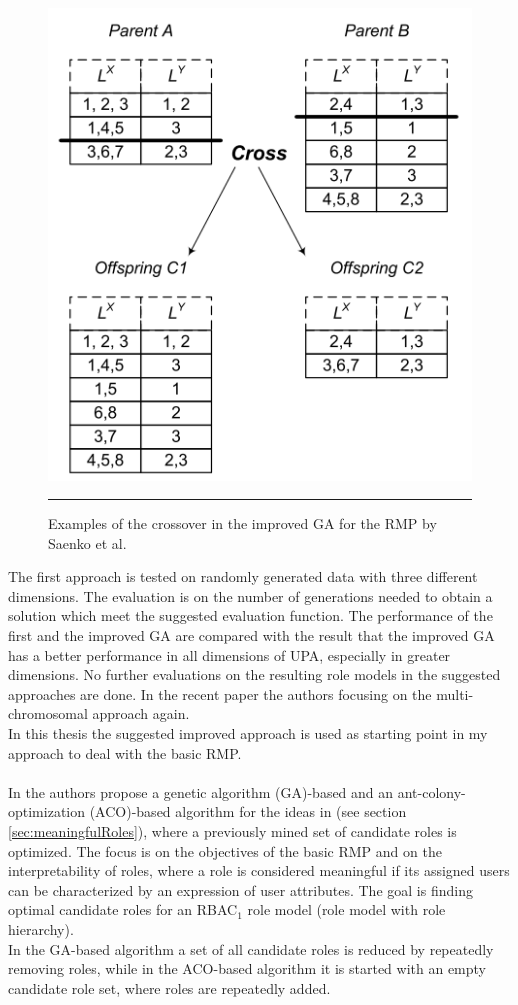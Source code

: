 \begin{figure}[H]
    \centering
    \includegraphics[scale=0.8]{./Figures/crossover.png}
    \rule{20em}{0.5pt}
    \caption{Examples of the crossover in the improved GA for the RMP by Saenko et al.\cite{saenko2012design}}
    \label{fig:crossover}
\end{figure}
The first approach is tested on randomly generated data with three different dimensions\cite{Igor}. The evaluation is on the number of generations needed to obtain a solution which meet the suggested evaluation function. The performance of the first and the improved GA are compared with the result that the improved GA has a better performance in all dimensions of UPA, especially in greater dimensions\cite{saenko2012design}. No further evaluations on the resulting role models in the suggested approaches are done. In the recent paper \cite{Kotenko:2015} the authors focusing on the multi-chromosomal approach again.\\
In this thesis the suggested improved approach is used as starting point in my approach to deal with the basic RMP.\\\\
In \cite{DuChang} the authors propose a genetic algorithm (GA)-based and an ant-colony-optimization (ACO)-based algorithm for the ideas in \cite{Xu} (see section \ref{sec:meaningfulRoles}), where a previously mined set of candidate roles is optimized. The focus is on the objectives of the basic RMP and on the interpretability of roles, where a role is considered meaningful if its assigned users can be characterized by an expression of user attributes. The goal is finding optimal candidate roles for an RBAC$_1$ role model (role model with role hierarchy).\\
In the GA-based algorithm a set of all candidate roles is reduced by repeatedly removing roles, while in the ACO-based algorithm it is started with an empty candidate role set, where roles are repeatedly added.

